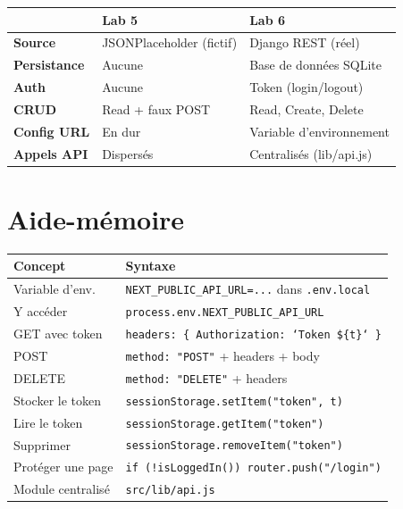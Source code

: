 \documentclass[11pt,a4paper]{article}
\begin{document}
\begin{retenirbox}
\begin{center}
\begin{tabular}{lp{4.5cm}p{4.5cm}}
\toprule
& \textbf{Lab 5} & \textbf{Lab 6} \\
\midrule
\textbf{Source} & JSONPlaceholder (fictif) & Django REST (réel) \\
\textbf{Persistance} & Aucune & Base de données SQLite \\
\textbf{Auth} & Aucune & Token (login/logout) \\
\textbf{CRUD} & Read + faux POST & Read, Create, Delete \\
\textbf{Config URL} & En dur & Variable d'environnement \\
\textbf{Appels API} & Dispersés & Centralisés (lib/api.js) \\
\bottomrule
\end{tabular}
\end{center}
\end{retenirbox}

\section{Aide-mémoire}

\begin{center}
\begin{tabular}{lp{7.5cm}}
\toprule
\textbf{Concept} & \textbf{Syntaxe} \\
\midrule
Variable d'env. & \texttt{NEXT\_PUBLIC\_API\_URL=...} dans \texttt{.env.local} \\
Y accéder & \texttt{process.env.NEXT\_PUBLIC\_API\_URL} \\
\midrule
GET avec token & \texttt{headers: \{ Authorization: `Token \$\{t\}` \}} \\
POST & \texttt{method: "POST"} + headers + body \\
DELETE & \texttt{method: "DELETE"} + headers \\
\midrule
Stocker le token & \texttt{sessionStorage.setItem("token", t)} \\
Lire le token & \texttt{sessionStorage.getItem("token")} \\
Supprimer & \texttt{sessionStorage.removeItem("token")} \\
\midrule
Protéger une page & \texttt{if (!isLoggedIn()) router.push("/login")} \\
Module centralisé & \texttt{src/lib/api.js} \\
\bottomrule
\end{tabular}
\end{center}
\end{document}
